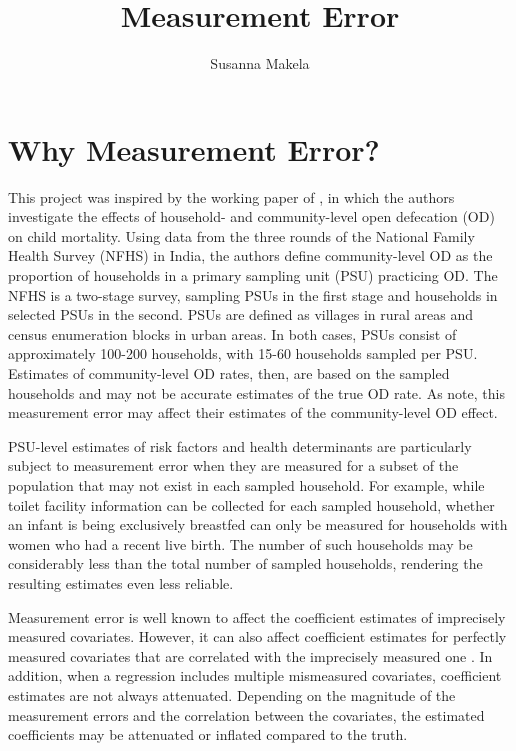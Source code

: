 \documentclass[10pt,a4paper]{article}
\title{Measurement Error}
\author{Susanna Makela}
\begin{document}
\maketitle

\section*{Why Measurement Error?}
This project was inspired by the working paper of \cite{gs2015}, in which the authors investigate the effects of household- and community-level open defecation (OD) on child mortality. Using data from the three rounds of the National Family Health Survey (NFHS) in India, the authors define community-level OD as the proportion of households in a primary sampling unit (PSU) practicing OD. The NFHS is a two-stage survey, sampling PSUs in the first stage and households in selected PSUs in the second. PSUs are defined as villages in rural areas and census enumeration blocks in urban areas. In both cases, PSUs consist of approximately 100-200 households, with 15-60 households sampled per PSU. Estimates of community-level OD rates, then, are based on the sampled households and may not be accurate estimates of the true OD rate. As \cite{gs2015} note, this measurement error may affect their estimates of the community-level OD effect.

PSU-level estimates of risk factors and health determinants are particularly subject to measurement error when they are measured for a subset of the population that may not exist in each sampled household. For example, while toilet facility information can be collected for each sampled household, whether an infant is being exclusively breastfed can only be measured for households with women who had a recent live birth. The number of such households may be considerably less than the total number of sampled households, rendering the resulting estimates even less reliable.

Measurement error is well known to affect the coefficient estimates of imprecisely measured covariates. However, it can also affect coefficient estimates for perfectly measured covariates that are correlated with the imprecisely measured one \citep{gustafson_book}. In addition, when a regression includes multiple mismeasured covariates, coefficient estimates are not always attenuated. Depending on the magnitude of the measurement errors and the correlation between the covariates, the estimated coefficients may be attenuated or inflated compared to the truth.
\end{document}
